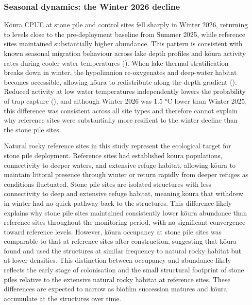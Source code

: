 \documentclass[
  letterpaper,
  DIV=11,
  numbers=noendperiod]{scrartcl}
\begin{document}
\subsubsection{Seasonal dynamics: the Winter 2026
decline}\label{seasonal-dynamics-the-winter-2026-decline}

Kōura CPUE at stone pile and control sites fell sharply in Winter 2026,
returning to levels close to the pre-deployment baseline from Summer
2025, while reference sites maintained substantially higher abundance.
This pattern is consistent with known seasonal migration behaviour
across lake depth profiles and kōura activity rates during cooler water
temperatures (). When lake
thermal stratification breaks down in winter, the hypolimnion
re-oxygenates and deep-water habitat becomes accessible, allowing kōura
to redistribute along the depth gradient
(). Reduced activity at low
water temperatures independently lowers the probability of trap capture
(), and although Winter 2026 was
1.5 °C lower than Winter 2025, this difference was consistent across all
site types and therefore cannot explain why reference sites were
substantially more resilient to the winter decline than the stone pile
sites.

Natural rocky reference sites in this study represent the ecological
target for stone pile deployment. Reference sites had established kōura
populations, connectivity to deeper waters, and extensive refuge
habitat, allowing kōura to maintain littoral presence through winter or
return rapidly from deeper refuges as conditions fluctuated. Stone pile
sites are isolated structures with less connectivity to deep and
extensive refuge habitat, meaning kōura that withdrew in winter had no
quick pathway back to the structures. This difference likely explains
why stone pile sites maintained consistently lower kōura abundance than
reference sites throughout the monitoring period, with no significant
convergence toward reference levels. However, kōura occupancy at stone
pile sites was comparable to that at reference sites after construction,
suggesting that kōura found and used the structures at similar frequency
to natural rocky habitat but at lower densities. This distinction
between occupancy and abundance likely reflects the early stage of
colonisation and the small structural footprint of stone piles relative
to the extensive natural rocky habitat at reference sites. These
differences are expected to narrow as biofilm succession matures and
kōura accumulate at the structures over time.
\end{document}
